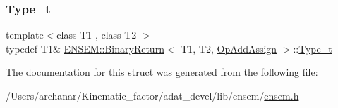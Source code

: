 \mbox{\label{structENSEM_1_1BinaryReturn_3_01T1_00_01T2_00_01OpAddAssign_01_4_a6d1b6a141221e93d9b7af97762049ec0}} 
\subsubsection{\texorpdfstring{Type\_t}{Type\_t}\hspace{0.1cm}{\footnotesize\ttfamily [2/2]}}
{\footnotesize\ttfamily template$<$class T1 , class T2 $>$ \\
typedef T1\& \mbox{\hyperlink{structENSEM_1_1BinaryReturn}{E\+N\+S\+E\+M\+::\+Binary\+Return}}$<$ T1, T2, \mbox{\hyperlink{structENSEM_1_1OpAddAssign}{Op\+Add\+Assign}} $>$\+::\mbox{\hyperlink{structENSEM_1_1BinaryReturn_3_01T1_00_01T2_00_01OpAddAssign_01_4_a6d1b6a141221e93d9b7af97762049ec0}{Type\+\_\+t}}}



The documentation for this struct was generated from the following file\+:\begin{DoxyCompactItemize}
\item 
/\+Users/archanar/\+Kinematic\+\_\+factor/adat\+\_\+devel/lib/ensem/\mbox{\hyperlink{lib_2ensem_2ensem_8h}{ensem.\+h}}\end{DoxyCompactItemize}
